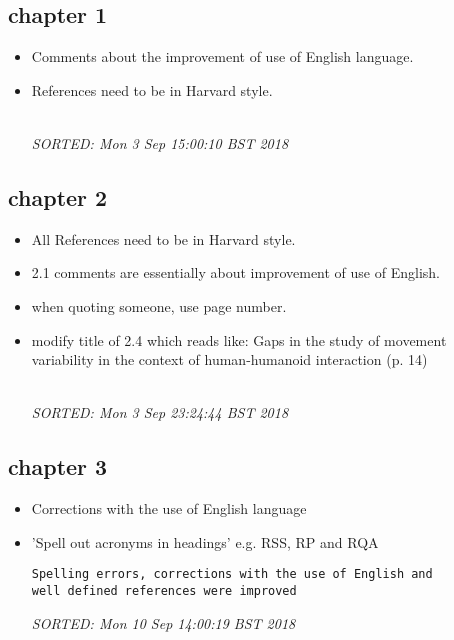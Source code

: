 \documentclass[10pt]{article}
\begin{document}
\subsection{chapter 1}

\begin{itemize}[noitemsep,topsep=0pt]
\item Comments about the improvement of use of English language. \\

\item References need to be in Harvard style. 

\textit{
\\
SORTED:  Mon  3 Sep 15:00:10 BST 2018
}



\end{itemize}




\subsection{chapter 2}

\begin{itemize}[noitemsep,topsep=0pt]
\item All References need to be in Harvard style.
 
\item 2.1 comments are essentially about improvement of use of English.

\item when quoting someone, use page number.

\item modify title of 2.4 which reads like:
	Gaps in the study of movement variability in the context of 
	human-humanoid interaction (p. 14)


\textit{
\\
SORTED:  Mon  3 Sep 23:24:44 BST 2018
}



\end{itemize}

\subsection{chapter 3}

\begin{itemize}[noitemsep,topsep=0pt]


\item Corrections with the use of English language

\item 'Spell out acronyms in headings'
	e.g. RSS, RP and RQA

\begin{verbatim}
Spelling errors, corrections with the use of English and
well defined references were improved
\end{verbatim}
\textit{
SORTED: Mon 10 Sep 14:00:19 BST 2018
}
\\




\end{itemize}
\end{document}
